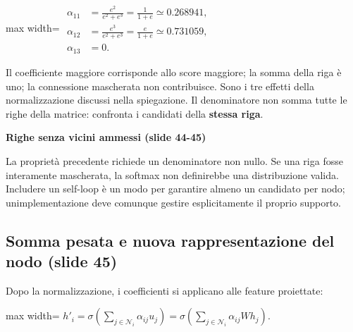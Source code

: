 \documentclass[11pt,a4paper,oneside,openany]{book}
\renewenvironment{quote}{\list{}{\leftmargin=1em\rightmargin=0pt}\item\relax}{\endlist}
\begin{document}
\begin{center}
\begin{adjustbox}{max width=\linewidth}
$\displaystyle \begin{aligned}
\alpha_{11}&=\frac{e^2}{e^2+e^3}=\frac1{1+e}\simeq0.268941,\\
\alpha_{12}&=\frac{e^3}{e^2+e^3}=\frac e{1+e}\simeq0.731059,\\
\alpha_{13}&=0.
\end{aligned}$
\end{adjustbox}
\end{center}

Il coefficiente maggiore corrisponde allo score maggiore; la somma della riga è uno; la connessione mascherata non contribuisce. Sono i tre effetti della normalizzazione discussi nella spiegazione. Il denominatore non somma tutte le righe della matrice: confronta i candidati della \textbf{stessa riga}.

\begin{quote}
\textbf{Righe senza vicini ammessi (slide 44-45)}
\end{quote}

\begin{quote}
La proprietà precedente richiede un denominatore non nullo. Se una riga fosse interamente mascherata, la softmax non definirebbe una distribuzione valida. Includere un self-loop è un modo per garantire almeno un candidato per nodo; un\textquotesingle implementazione deve comunque gestire esplicitamente il proprio supporto.
\end{quote}

\subsection{Somma pesata e nuova rappresentazione del nodo (slide 45)}\label{f05-n30-r921}

Dopo la normalizzazione, i coefficienti si applicano alle feature proiettate:

\begin{center}
\begin{adjustbox}{max width=\linewidth}
$\displaystyle \boxed{h'_i=\sigma\left(\sum_{j\in\mathcal N_i}\alpha_{ij}u_j\right)
=\sigma\left(\sum_{j\in\mathcal N_i}\alpha_{ij}Wh_j\right).}$
\end{adjustbox}
\end{center}
\end{document}
